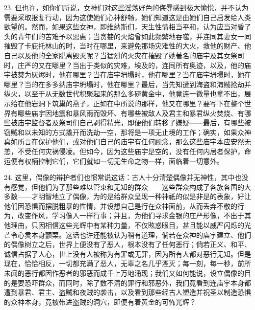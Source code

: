 23. 但也许，如你们所说，女神们对这些淫荡好色的侮辱感到极大愉悦，并不认为需要采取报复行动，因为这使她们心神舒畅，她们知道这是由她们自己启发给人类欲望的。然而，如果这些女神，即维纳斯们，天生性情相当平和，认为应当对昏了头的青年们的苦难予以恩惠；当贪婪的火焰曾如此频繁地吞噬，并连同其妻女一同摧毁了卡庇托林山的时，当时在哪里，来避免那场灾难性的大火，救他的财产、他自己以及他的全家脱离毁灭呢？当猛烈的火灾在摧毁了她著名的庙宇及其女祭司时，庄严的又在哪里？当出于类似的灾难，埃及的，连同所有奥迹，以及，他的庙宇被焚为灰烬时，他在哪里？当在庙宇坍塌时，他在哪里？当在庙宇坍塌时，她在哪里？当的在多多纳庙宇坍塌时，他在哪里？最后，当先知遭到海盗和海贼抢劫并纵火，以至于从无数世代积聚起来的那么多磅黄金中，他竟连一微量也拿不出，展示给在他岩洞下筑巢的燕子，正如在中所说的那样，他又在哪里？要写下在整个世界有哪些庙宇因地震和暴风雨而毁坏、有哪些被敌人及君主和暴君纵火焚烧、有哪些被庙宇监督者及祭司们自己剥得精光，即便他们转移了嫌疑——最后，有哪些被窃贼和以未知的方式撬开而洗劫一空，那将是一项无止境的工作；确实，如果众神真如所言在保护他们，或对他们自己的庙宇有任何顾念，那么这些庙宇本应安然无恙，不受任何灾祸侵凌。但如今，因为这些庙宇是空的，没有任何内居者保护，命运便有权柄控制它们，它们就如一切无生命之物一样，面临着一切意外。\par

24. 这里，偶像的辩护者们也惯常说这话：古人十分清楚偶像并无神性，其中也没有感觉，但他们为了那些难以管束和无知的群众——这些群众构成了各族各国的大多数——才明智地立了偶像，为的是给群众呈现一种神祇的似是非是的表象，好让他们因恐惧而摆脱粗暴的性情，并设想自己是行在众神面前，从而丢弃不敬的行为，改变作风，学习像人一样行事；并且，为他们寻求金银的庄严形像，不出于其他理由，只因相信这些光辉中有某种力量，不仅眩惑眼目，甚且能以威严闪烁的光芒令心灵本身颤栗。这话也许还能被认为稍有道理，倘若在众神的庙宇建立、他们的偶像树立之后，世界上便没有了恶人，根本没有了任何恶行；倘若正义、和平、诚信占据了人心，世上没有人被称为有罪或无罪，因为所有人都对恶行无知。但是现在，恰恰相反，一切都充满了恶人，无辜之名几乎湮灭；每一刻，每一秒，前所未闻的恶行都因作恶者的邪恶而成千上万地涌现；我们又如何能说，设立偶像的目的是要恐吓群众，而同时，除了数不清的罪行和邪恶外，我们竟看到连庙宇本身都遭到暴君、君主、盗贼和夜贼的袭击，以及看到那些经古人塑造并祝圣以制造恐惧的众神本身，竟被带进盗贼的洞穴，即便有着黄金的可怖光辉？\par

